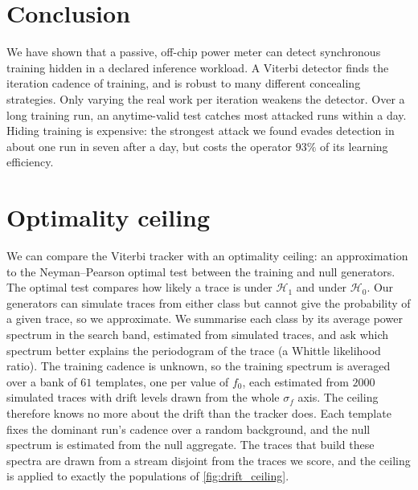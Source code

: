 \documentclass{article}
\begin{document}
\section{Conclusion}
\label{sec:conclusion}

We have shown that a passive, off-chip power meter can detect synchronous training hidden in a declared inference workload. A Viterbi detector finds the iteration cadence of training, and is robust to many different concealing strategies. Only varying the real work per iteration weakens the detector. Over a long training run, an anytime-valid test catches most attacked runs within a day. Hiding training is
expensive: the strongest attack we found evades detection in about one run in
seven after a day, but costs the operator $93\%$ of its learning efficiency. 





\newpage
\appendix
\onecolumn

\section{Optimality ceiling}
\label{app:ceiling}

We can compare the Viterbi tracker with an
optimality ceiling: an approximation to the Neyman--Pearson optimal test between
the training and null generators. The optimal test compares how likely a trace
is under $\mathcal{H}_1$ and under $\mathcal{H}_0$. Our generators can simulate
traces from either class but cannot give the probability of a given trace, so
we approximate. We summarise each class by its average power spectrum in the
search band, estimated from simulated traces, and ask which spectrum better
explains the periodogram of the trace (a Whittle likelihood ratio). The training
cadence is unknown, so the training spectrum is averaged over a bank of $61$
templates, one per value of $f_0$, each estimated from $2000$ simulated traces
with drift levels drawn from the whole $\sigma_f$ axis. The ceiling therefore
knows no more about the drift than the tracker does. Each template fixes the
dominant run's cadence over a random background, and the null spectrum is
estimated from the null aggregate. The traces that build these spectra are drawn
from a stream disjoint from the traces we score, and the ceiling is applied to
exactly the populations of \cref{fig:drift_ceiling}.
\end{document}
